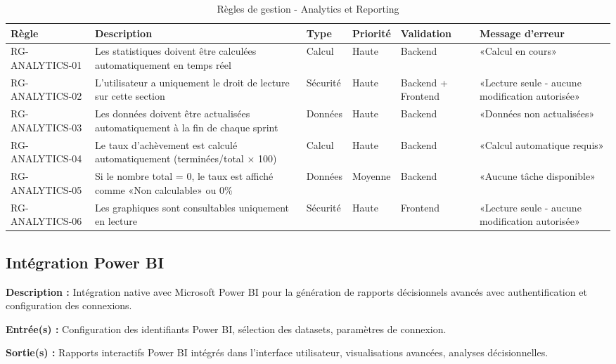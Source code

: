     \begin{table}[H]
        \centering
\footnotesize
\begin{tabular}{|p{1.5cm}|p{3.5cm}|p{1.5cm}|p{1.5cm}|p{2cm}|p{2.5cm}|}
            \hline
\textbf{Règle} & \textbf{Description} & \textbf{Type} & \textbf{Priorité} & \textbf{Validation} & \textbf{Message d'erreur} \\
            \hline
RG-ANALYTICS-01 & Les statistiques doivent être calculées automatiquement en temps réel & Calcul & Haute & Backend & «Calcul en cours» \\
            \hline
RG-ANALYTICS-02 & L'utilisateur a uniquement le droit de lecture sur cette section & Sécurité & Haute & Backend + Frontend & «Lecture seule - aucune modification autorisée» \\
            \hline
RG-ANALYTICS-03 & Les données doivent être actualisées automatiquement à la fin de chaque sprint & Données & Haute & Backend & «Données non actualisées» \\
            \hline
RG-ANALYTICS-04 & Le taux d'achèvement est calculé automatiquement (terminées/total × 100) & Calcul & Haute & Backend & «Calcul automatique requis» \\
            \hline
RG-ANALYTICS-05 & Si le nombre total = 0, le taux est affiché comme «Non calculable» ou 0\% & Données & Moyenne & Backend & «Aucune tâche disponible» \\
            \hline
RG-ANALYTICS-06 & Les graphiques sont consultables uniquement en lecture & Sécurité & Haute & Frontend & «Lecture seule - aucune modification autorisée» \\
            \hline
        \end{tabular}
\caption{Règles de gestion - Analytics et Reporting}
\label{tab:rg_analytics}
    \end{table}

\subsection{Intégration Power BI}
\textbf{Description :} Intégration native avec Microsoft Power BI pour la génération de rapports décisionnels avancés avec authentification et configuration des connexions.
    
\textbf{Entrée(s) :} Configuration des identifiants Power BI, sélection des datasets, paramètres de connexion.
    
\textbf{Sortie(s) :} Rapports interactifs Power BI intégrés dans l'interface utilisateur, visualisations avancées, analyses décisionnelles.
    

